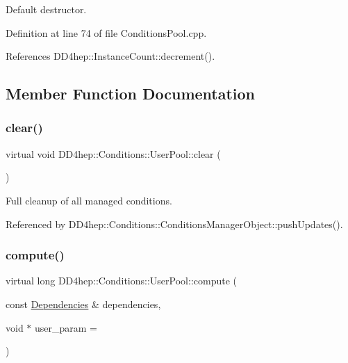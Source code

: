 Default destructor. 



Definition at line 74 of file Conditions\+Pool.\+cpp.



References D\+D4hep\+::\+Instance\+Count\+::decrement().



\subsection{Member Function Documentation}
\hypertarget{class_d_d4hep_1_1_conditions_1_1_user_pool_aa1b208b96c66bee13ee9f2bd6b7aaac5}{}\label{class_d_d4hep_1_1_conditions_1_1_user_pool_aa1b208b96c66bee13ee9f2bd6b7aaac5} 
\subsubsection{\texorpdfstring{clear()}{clear()}}
{\footnotesize\ttfamily virtual void D\+D4hep\+::\+Conditions\+::\+User\+Pool\+::clear (\begin{DoxyParamCaption}{ }\end{DoxyParamCaption})\hspace{0.3cm}{\ttfamily [pure virtual]}}



Full cleanup of all managed conditions. 



Referenced by D\+D4hep\+::\+Conditions\+::\+Conditions\+Manager\+Object\+::push\+Updates().

\hypertarget{class_d_d4hep_1_1_conditions_1_1_user_pool_a117faa4219d68ba50835ac691b538b08}{}\label{class_d_d4hep_1_1_conditions_1_1_user_pool_a117faa4219d68ba50835ac691b538b08} 
\subsubsection{\texorpdfstring{compute()}{compute()}}
{\footnotesize\ttfamily virtual long D\+D4hep\+::\+Conditions\+::\+User\+Pool\+::compute (\begin{DoxyParamCaption}\item[{const \hyperlink{class_d_d4hep_1_1_conditions_1_1_user_pool_a0da9a8bee4190e4deebf83102902118d}{Dependencies} \&}]{dependencies,  }\item[{void $\ast$}]{user\+\_\+param = {} }\end{DoxyParamCaption})\hspace{0.3cm}{\ttfamily [pure virtual]}}



